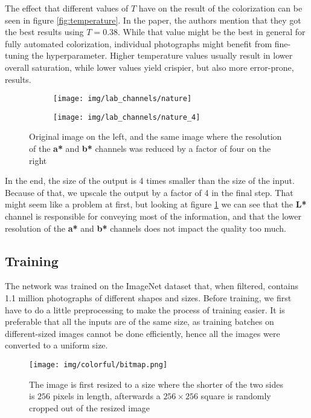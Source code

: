 The effect that different values of $T$ have on the result of the colorization
can be seen in figure \ref{fig:temperature}. In the paper, the authors mention
that they got the best results using $T=0.38$. While that value might be the best
in general for fully automated colorization, individual photographs might benefit
from fine-tuning the hyperparameter. Higher temperature values usually result in 
lower overall saturation, while lower values yield crispier, but also more error-prone, results.

\begin{figure}[!ht]
	\centering
	\begin{subfigure}{.49\textwidth}
		\centering
		\texttt{[image: img/lab\_channels/nature]}
	\end{subfigure}
	\begin{subfigure}{.49\textwidth}
		\centering
		\texttt{[image: img/lab\_channels/nature\_4]}
	\end{subfigure}
    \caption{Original image on the left, and the same image where the resolution of the \textbf{a*} and \textbf{b*} channels was reduced by a factor of four on the right}
	\label{fig:color4}
\end{figure}

In the end, the size of the output is 4 times smaller than the size of the input. 
Because of that, we upscale the output by a factor of 4 in the final step. That might
seem like a problem at first, but looking at figure \ref{fig:color4} we can see
that the \textbf{L*} channel is responsible for conveying most of the information, and
that the lower resolution of the \textbf{a*} and \textbf{b*} channels does not impact
the quality too much.

\subsection{Training}

The network was trained on the ImageNet dataset that, when filtered, contains
1.1 million photographs of different shapes and sizes. Before training, we first
have to do a little preprocessing to make the process of training easier. It is 
preferable that all the inputs are of the same size, as training batches on 
different-sized images cannot be done efficiently, hence all the images were 
converted to a uniform size. 

\begin{figure}[!ht]
	\centering
	\texttt{[image: img/colorful/bitmap.png]}
    \caption{
	The image is first resized to a size where the shorter of the two sides
	is $256$ pixels in length, afterwards a $256\times256$ square is 
	randomly cropped out of the resized image}
	\label{fig:crop}
\end{figure}

